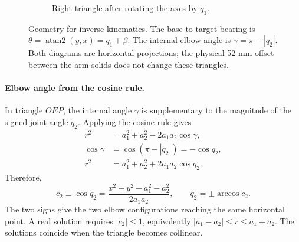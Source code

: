 \documentclass[11pt,a4paper]{article}
\begin{document}
\begin{figure}[H]
\begin{subfigure}[t]{.49\linewidth}
\caption{Right triangle after rotating the axes by $q_1$.}
\end{subfigure}
\caption{Geometry for inverse kinematics. The base-to-target bearing is
$\theta=\operatorname{atan2}(y,x)=q_1+\beta$. The internal elbow angle is
$\gamma=\pi-|q_2|$. Both diagrams are horizontal projections; the physical
52 mm offset between the arm solids does not change these triangles.}
\label{fig:iktriangles}
\end{figure}

\paragraph{Elbow angle from the cosine rule.}
In triangle $OEP$, the internal angle $\gamma$ is supplementary to the
magnitude of the signed joint angle $q_2$. Applying the cosine rule gives
\begin{align}
 r^2&=a_1^2+a_2^2-2a_1a_2\cos\gamma,\\
 \cos\gamma&=\cos(\pi-|q_2|)=-\cos q_2,\\
 r^2&=a_1^2+a_2^2+2a_1a_2\cos q_2.
\end{align}
Therefore,
\begin{equation}
 c_2\equiv\cos q_2=\frac{x^2+y^2-a_1^2-a_2^2}{2a_1a_2},\qquad
 \boxed{q_2=\pm\arccos c_2}.
\end{equation}
The two signs give the two elbow configurations reaching the same
horizontal point. A real solution requires $|c_2|\leq1$, equivalently
$|a_1-a_2|\leq r\leq a_1+a_2$. The solutions coincide when the triangle
becomes collinear.
\end{document}
